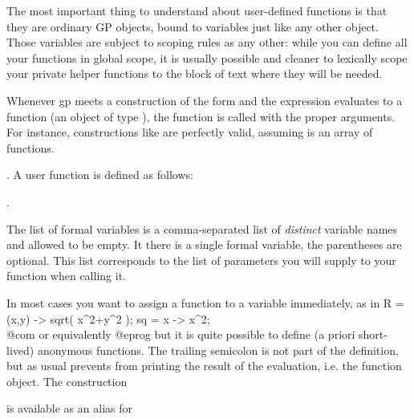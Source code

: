 The most important thing to understand about user-defined functions is
that they are ordinary GP objects, bound to variables just like any
other object. Those variables are subject to scoping rules as any other:
while you can define all your functions in global scope, it is usually
possible and cleaner to lexically scope your private helper functions to the
block of text where they will be needed.

Whenever gp meets a construction of the form 
and the expression  evaluates to a function (an object of type
), the function is called with the proper arguments. For
instance, constructions like  are perfectly valid,
assuming  is an array of functions.

.\label{se:userfundef}
A user function is defined as follows:

  .

\noindent The list of formal variables is a comma-separated list of
\emph{distinct} variable names and allowed to be empty. It there is a single
formal variable, the parentheses are optional. This list corresponds to the
list of parameters you will supply to your function when calling it.

In most cases you want to assign a function to a variable immediately, as in
\bprog
R = (x,y) -> sqrt( x^2+y^2 );
sq = x -> x^2;  \\@com or equivalently 
@eprog\noindent
but it is quite possible to define (a priori short-lived) anonymous functions.
The trailing semicolon is not part of the definition, but as usual prevents
 from printing the result of the evaluation, i.e. the function
object. The construction


\noindent is available as an alias for


